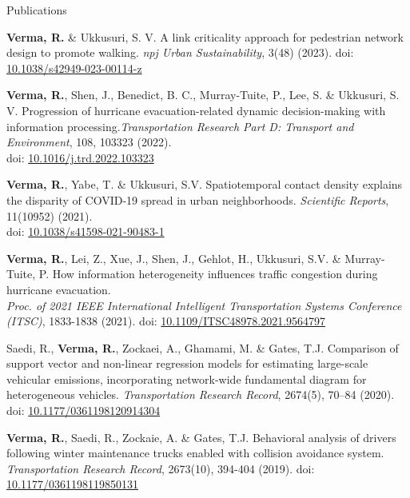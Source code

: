 \documentclass{CV} %
\begin{document}
\begin{rSection}{Publications}
\begin{etaremune}
        \item \textbf{Verma, R.} \& Ukkusuri, S. V. A link criticality approach for pedestrian network design to promote walking. \textit{npj Urban Sustainability}, 3(48) (2023). doi: \href{https://doi.org/10.1038/s42949-023-00114-z}{10.1038/s42949-023-00114-z}
        
        \item \textbf{Verma, R.}, Shen, J., Benedict, B. C., Murray-Tuite, P., Lee, S. \& Ukkusuri, S. V. Progression of hurricane evacuation-related dynamic decision-making with information processing.\textit{Transportation Research Part D: Transport and Environment}, 108, 103323 (2022).\\doi: \href{https://doi.org/10.1016/j.trd.2022.103323}{10.1016/j.trd.2022.103323}
        
        \item \textbf{Verma, R.}, Yabe, T. \& Ukkusuri, S.V. Spatiotemporal contact density explains the disparity of COVID-19 spread in urban neighborhoods. \textit{Scientific Reports}, 11(10952) (2021).
        \\ doi: \href{https://www.nature.com/articles/s41598-021-90483-1}{10.1038/s41598-021-90483-1}
        
        \item \textbf{Verma, R.}, Lei, Z., Xue, J., Shen, J., Gehlot, H., Ukkusuri, S.V. \& Murray-Tuite, P. How information heterogeneity influences traffic congestion during hurricane evacuation.
        \\ \textit{Proc. of 2021 IEEE International Intelligent Transportation Systems Conference (ITSC)}, 1833-1838 (2021). doi: \href{https://ieeexplore.ieee.org/document/9564797}{10.1109/ITSC48978.2021.9564797}

        \item Saedi, R., \textbf{Verma, R.}, Zockaei, A., Ghamami, M. \& Gates, T.J. Comparison of support vector and non-linear regression models for estimating large-scale vehicular emissions, incorporating network-wide fundamental diagram for heterogeneous vehicles. \textit{Transportation Research Record}, 2674(5), 70–84 (2020). doi: \href{https://journals.sagepub.com/doi/abs/10.1177/0361198120914304}{10.1177/0361198120914304}
        
        \item \textbf{Verma, R.}, Saedi, R., Zockaie, A. \& Gates, T.J. Behavioral analysis of drivers following winter maintenance trucks enabled with collision avoidance system. \textit{Transportation Research Record}, 2673(10), 394-404 (2019). doi: \href{https://journals.sagepub.com/doi/abs/10.1177/0361198119850131}{10.1177/0361198119850131}
        

\end{etaremune}
\end{rSection}
\end{document}

